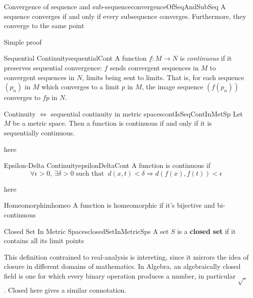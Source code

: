 \documentclass{book}
\newcommand{\rw}{\rightarrow}
\newcommand{\Rw}{\Rightarrow}
\newcommand{\LRw}{\Leftrightarrow}
\renewcommand{\bf}[1]{\textbf{#1}}
\newenvironment{Proof}[1][]
  {\begin{ProofTcb}[#1]}
  {\end{ProofTcb}}
\begin{document}
\begin{cor}{Convergence of sequence and sub-sequence}{convergenceOfSeqAndSubSeq}
	A sequence converges if and only if every subsequence converges. Furthermore, they converge to the same point
\end{cor}

\begin{Proof}
	Simple proof
\end{Proof}

\begin{defn}{Sequential Continuity}{sequentialCont}
	A function $f: M \rw N$ is \emph{continuous} if it preserves sequential convergence: $f$ sends convergent sequences
	in $M$ to convergent sequences in $N$, limits being sent to limits. That is, for each sequence $(p_n)$ in $M$ which
	converges to a limit $p$ in $M$, the image sequence $(f(p_n))$ converges to $fp$ in $N$.
\end{defn}

\begin{cor}{Continuity $\LRw$ sequential continuity in metric spaces}{contIsSeqContInMetSp}
	Let $M$ be a metric space. Then a function is continuous if and only if it is sequentially continuous.
\end{cor}

\begin{Proof}
	here
\end{Proof}

\begin{cor}{Epsilon-Delta Continuity}{epsilonDeltaCont}
	A function is continuous if
	\[
		\forall \epsilon > 0,\ \exists \delta > 0 \text{ such that }\ d(x,t) < \delta \Rw d(f(x), f(t)) < \epsilon
	\]
\end{cor}

\begin{Proof}
	here
\end{Proof}

\begin{defn}{Homeomorphim}{homeo}
	A function is homeomorphic if it's bijective and bi-continuous
\end{defn}

\begin{defn}{Closed Set In Metric Spaces}{closedSetInMetricSps}
	A set $S$ is a \bf{closed set} if it contains all its limit points
\end{defn}

This definition contrained to real-analysis is intereting, since it mirrors the idea of closure in different domains of
mathematics. In Algebra, an algebraically closed field is one for which every binary operation produces a number, in
particular $\sqrt{\_}$. Closed here gives a similar connotation.
\end{document}
